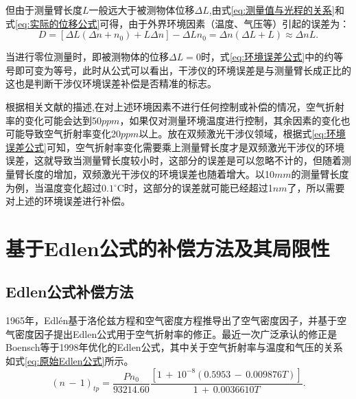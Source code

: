 但由于测量臂长度\(L\)一般远大于被测物体位移\(\Delta L\),由式\eqref{eq:测量值与光程的关系}和式\eqref{eq:实际的位移公式}可得，由于外界环境因素（温度、气压等）引起的误差为：
\begin{equation}\label{eq:环境误差公式}
    D=[\Delta L(\Delta n+n_0)+L\Delta n]-\Delta Ln_0=\Delta n(\Delta L+L) \approx \Delta n L.
\end{equation}

当进行零位测量时，即被测物体的位移$\Delta L = 0$时，式\eqref{eq:环境误差公式}中的约等号即可变为等号，此时从公式可以看出，干涉仪的环境误差是与测量臂长成正比的这也是判断干涉仪环境误差补偿是否精准的标志。

根据相关文献的描述\cite{徐建2013双频激光干涉仪系统线性测量误差主要来源及减小误差的方法分析},在对上述环境因素不进行任何控制或补偿的情况，空气折射率的变化可能会达到50$ppm$，如果仅对测量环境温度进行控制，其余因素的变化也可能导致空气折射率变化20$ppm$以上。放在双频激光干涉仪领域，根据式\eqref{eq:环境误差公式}可知，空气折射率变化需要乘上测量臂长度才是双频激光干涉仪的环境误差，这就导致当测量臂长度较小时，这部分的误差是可以忽略不计的，但随着测量臂长度的增加，双频激光干涉仪的环境误差也随着增大。以10$mm$的测量臂长度为例，当温度变化超过\(0.1\)$^{\circ}$C时，这部分的误差就可能已经超过1$nm$了，所以需要对上述的环境误差进行补偿。

\section{基于Edlen公式的补偿方法及其局限性}
\subsection{Edlen公式补偿方法}
1965年，Edlén基于洛伦兹方程和空气密度方程推导出了空气密度因子，并基于空气密度因子提出Edlen公式用于空气折射率的修正\cite{2015Refractive}。最近一次广泛承认的修正是Boensch等\cite{1998Fit}于1998年优化的Edlen公式，其中关于空气折射率与温度和气压的关系如式\eqref{eq:原始Edlen公式}所示。
    \begin{equation}\label{eq:原始Edlen公式}
    (n\,-\,1)_{tp}=\frac{Pn_0}{93214.60}\frac{[1\,+\,10^{-8}(0.5953\,-\,0.009876T)]}{1\,+\,0.0036610T}.
    \end{equation}

